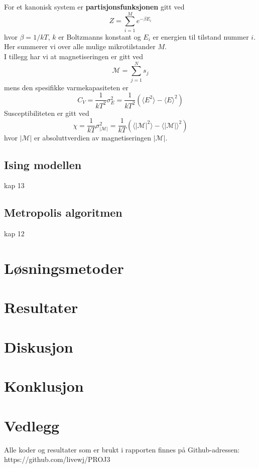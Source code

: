 \documentclass[11pt,a4paper]{article}
\begin{document}
For et kanonisk system er \textbf{partisjonsfunksjonen} gitt ved
\begin{equation}
Z = \sum_{i=1}^M e^{-\beta E_i }
\end{equation}
hvor $\beta = 1/kT$, $k$ er Boltzmanns konstant og $E_i$ er energien til tilstand nummer $i$. Her summerer vi over alle mulige mikrotilstander $M$.\\
I tillegg har vi at magnetiseringen er gitt ved
\begin{equation}
\mathcal{M} = \sum_{j=1} ^N s_j
\end{equation}
mens den spesifikke varmekapasiteten er
\begin{equation}
C_V = \frac{1}{kT^2}\sigma_E^2 = \frac{1}{kT^2}(\langle E^2 \rangle - \langle E \rangle^2 )
\end{equation}
Susceptibiliteten er gitt ved
\begin{equation}
\chi = \frac{1}{kT} \sigma_{|\mathcal{M}|}^2 = \frac{1}{kT}( \langle \mathcal{|M|}^2 \rangle - \langle |\mathcal{M}| \rangle^2 )
\end{equation}
hvor $|\mathcal{M} |$ er absoluttverdien av magnetiseringen $|\mathcal{M} |$.

\subsection{Ising modellen}
kap 13
\subsection{Metropolis algoritmen}
kap 12


\section{Løsningsmetoder}


\section{Resultater}


\section{Diskusjon}

\section{Konklusjon}

\section{Vedlegg}
Alle koder og resultater som er brukt i rapporten finnes på Github-adressen: \\
https://github.com/livewj/PROJ3
\end{document}
